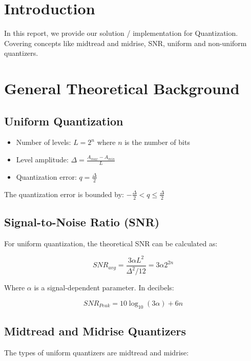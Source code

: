 \documentclass{article}
\begin{document}
\tableofcontents
\newpage

\listoffigures
\newpage

\section{Introduction}

In this report, we provide our solution / implementation for Quantization. Covering concepts like midtread and midrise, SNR, uniform and non-uniform quantizers.

\section{General Theoretical Background}

\subsection{Uniform Quantization}

\begin{itemize}
    \item Number of levels: $L = 2^n$ where $n$ is the number of bits
    \item Level amplitude: $\Delta = \frac{A_{max} - A_{min}}{L}$
    \item Quantization error: $q = \frac{\Delta}{2}$
\end{itemize}

The quantization error is bounded by: $-\frac{\Delta}{2} < q \leq \frac{\Delta}{2}$

\subsection{Signal-to-Noise Ratio (SNR)}

For uniform quantization, the theoretical SNR can be calculated as:

$$SNR_{avg} = \frac{3\alpha L^2}{\Delta^2/12} = 3\alpha 2^{2n}$$

Where $\alpha$ is a signal-dependent parameter. In decibels:

$$SNR_{Peak} = 10\log_{10}(3\alpha) + 6n$$


\subsection{Midtread and Midrise Quantizers}

The types of uniform quantizers are midtread and midrise:
\end{document}
